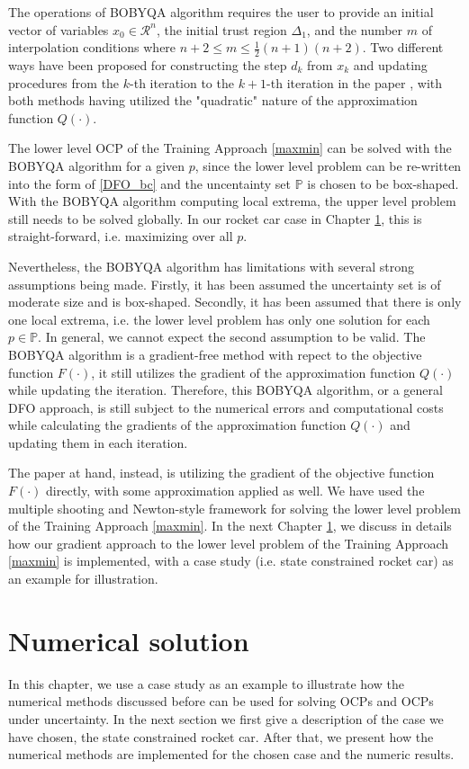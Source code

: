 \documentclass  [
  paper    = a4,
  BCOR     = 10mm,
  twoside,
  fontsize = 12pt,
  fleqn,
  toc      = bibnumbered,
  toc      = listofnumbered,
  numbers  = noendperiod,
  headings = normal,
  listof   = leveldown,
  version  = 3.03
]                                       {scrreprt}
\newcommand{\<}{\langle}
\renewcommand{\>}{\rangle}
\begin{document}
The operations of BOBYQA algorithm requires the user to provide an initial vector of variables $x_0 \in \mathcal{R}^n$, the initial trust region $\Delta_1$, and the number $m$ of interpolation conditions where $n+2 \leq m \leq \frac{1}{2}(n+1)(n+2)$. Two different ways have been proposed for constructing the step $d_k$ from $x_k$ and updating procedures from the $k$-th iteration to the $k+1$-th iteration in the paper \cite{MicPow09}, with both methods having utilized the "quadratic" nature of the approximation function $Q(\cdot)$.

The lower level OCP of the Training Approach \ref{maxmin} can be solved with the BOBYQA algorithm for a given $p$, since the lower level problem can be re-written into the form of \ref{DFO_bc} and the uncentainty set $\mathbb{P}$ is chosen to be box-shaped. With the BOBYQA algorithm computing local extrema, the upper level problem still needs to be solved globally. In our rocket car case in Chapter \ref{Chapter4}, this is straight-forward, i.e. maximizing over all $p$. 

Nevertheless, the BOBYQA algorithm has limitations with several strong assumptions being made. Firstly, it has been assumed the uncertainty set is of moderate size and is box-shaped. Secondly, it has been assumed that there is only one local extrema, i.e. the lower level problem has only one solution for each $p \in \mathbb{P}$. In general, we cannot expect the second assumption to be valid. The BOBYQA algorithm is a gradient-free method with repect to the objective function $F(\cdot)$, it still utilizes the gradient of the approximation function $Q(\cdot)$ while updating the iteration. Therefore, this BOBYQA algorithm, or a general DFO approach, is still subject to the numerical errors and computational costs while calculating the gradients of the approximation function $Q(\cdot)$  and updating them in each iteration.  

The paper at hand, instead, is utilizing the gradient of the objective function $F(\cdot)$ directly, with some approximation applied as well. We have used the multiple shooting and Newton-style framework for solving the lower level problem of the Training Approach \ref{maxmin}. In the next Chapter \ref{Chapter4}, we discuss in details how our gradient approach to the lower level problem of the Training Approach \ref{maxmin} is implemented,  with a case study (i.e. state constrained rocket car) as an example for illustration. 

\chapter{Numerical solution}
\label{Chapter4}
In this chapter, we use a case study as an example to illustrate how the numerical methods discussed before can be used for solving OCPs and OCPs under uncertainty. In the next section we first give a description of the case we have chosen, the state constrained rocket car. After that, we present how the numerical methods are implemented for the chosen case and the numeric results.  
\end{document}
